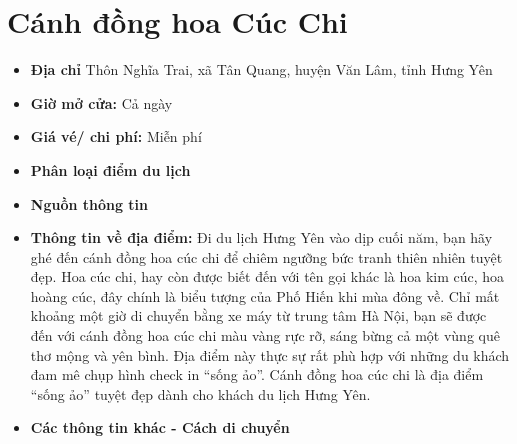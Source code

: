 \documentclass{article}
\begin{document}
\section{Cánh đồng hoa Cúc Chi}
\begin{itemize}
    \item{\textbf{Địa chỉ}} Thôn Nghĩa Trai, xã Tân Quang, huyện Văn Lâm, tỉnh Hưng Yên

    \item{\textbf{Giờ mở cửa:}} Cả ngày

    \item{\textbf{Giá vé/ chi phí:}} Miễn phí

    \item{\textbf{Phân loại điểm du lịch}} 

    \item{\textbf{Nguồn thông tin}} 

    \item{\textbf{Thông tin về địa điểm:}} Đi du lịch Hưng Yên vào dịp cuối năm, bạn hãy ghé đến cánh đồng hoa cúc chi để chiêm ngưỡng bức tranh thiên nhiên tuyệt đẹp. Hoa cúc chi, hay còn được biết đến với tên gọi khác là hoa kim cúc, hoa hoàng cúc, đây chính là biểu tượng của Phố Hiến khi mùa đông về. Chỉ mất khoảng một giờ di chuyển bằng xe máy từ trung tâm Hà Nội, bạn sẽ được đến với cánh đồng hoa cúc chi màu vàng rực rỡ, sáng bừng cả một vùng quê thơ mộng và yên bình. Địa điểm này thực sự rất phù hợp với những du khách đam mê chụp hình check in “sống ảo”. Cánh đồng hoa cúc chi là địa điểm “sống ảo” tuyệt đẹp dành cho khách du lịch Hưng Yên.
\end{itemize}

\begin{itemize}
    \item{\textbf{Các thông tin khác - Cách di chuyển}} 
\end{itemize}
\end{document}
